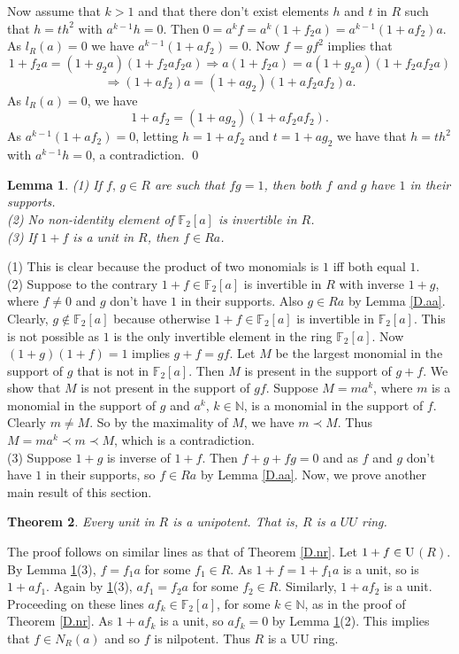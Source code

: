 \documentclass[12pt]{article}
\makeatletter
\theoremstyle{plain}
\newtheorem{thm}{Theorem}[section]
\newtheorem{lemma}[thm]{Lemma}
\theoremstyle{definition}
\renewenvironment{proof}[1][\proofname]{%
	\par\pushQED{\qed}%
	\normalfont %
	\topsep6\p@\@plus6\p@\relax
	\trivlist
	\item[\hskip\labelsep\bfseries #1\@addpunct{.}]%
}{%
	\popQED\endtrivlist\@endpefalse
}
\renewcommand{\proofname}{Proof}
\makeatother
\begin{document}
	Now assume that $k > 1$ and that there don't exist elements $h$ and $t$ in $R$ such that $h = th^2$ with $a^{k-1}h = 0$. Then $0 = a^kf = a^k(1 + f_2a) = a^{k-1}(1 + af_2)a$. As $l_R(a) = 0$ we have $a^{k-1}(1 + af_2) = 0$. Now $f = gf^2$ implies that $$1+f_2a = (1+g_2a)(1+f_2af_2a) \Rightarrow
	a(1+f_2a) = a(1+g_2a)(1+f_2af_2a)$$  $$\Rightarrow (1+af_2)a = (1+ag_2)(1+af_2af_2)a.$$ As $l_R(a) = 0$, we have
	$$ 1+af_2 = (1+ag_2)(1+af_2af_2).$$  As $a^{k-1}(1 + af_2) = 0$, letting $h = 1 + af_2$ and $t = 1+ag_2$ we have that $h = th^2$ with $a^{k-1}h = 0$, a contradiction. \qed
	\begin{lemma}\label{D.unitprop}
		\textup{(1)} If $f,\,g \in R$ are such that $fg = 1$, then both $f$ and $g$ have $1$ in their supports.\\[2mm]
		\textup{(2)} No non-identity element of $\mathbb{F}_2[a]$ is invertible in $R$. \\[2mm]
		\textup{(3)} If $1+f$ is a unit in $R$, then $f \in Ra$.
	\end{lemma}
	\begin{proof}
		\textup{(1)} This is clear because the product of two monomials is $1$ iff both equal $1$. \\[2mm]
		\textup{(2)} Suppose to the contrary $1 + f \in \mathbb{F}_2[a]$ is invertible in $R$ with inverse $1+g$, where $f\neq 0$ and $g$ don't have $1$ in their supports.
		Also $g \in Ra$ by Lemma \ref{D.aa}. Clearly, $g \notin \mathbb{F}_2[a]$ because otherwise $1+f \in \mathbb{F}_2[a]$ is invertible in $\mathbb{F}_2[a]$. This is not possible as $1$ is the only invertible element in the ring $\mathbb{F}_2[a]$. Now $(1+g)(1+f)=1$ implies $g+f = gf$. Let $M$ be the largest monomial in the support of $g$ that is not in $\mathbb{F}_2[a]$. Then $M$ is present in the support of $g+f$. We show that $M$ is not present in the support of $gf$. Suppose $M = ma^k$, where $m$ is a monomial in the support of $g$ and $a^k$, $k \in \mathbb{N}$, is a monomial in the support of $f$. Clearly $m \neq M$. So by the maximality of $M$, we have $m \prec M$. Thus $M = ma^k \prec m \prec M$, which is a contradiction. \\[2mm]
		\textup{(3)} Suppose $1+g$ is inverse of $1+f$. Then $f + g + fg = 0$ and as $f$ and $g$ don't have $1$ in their supports, so $f\in Ra$ by Lemma \ref{D.aa}. 
	\end{proof}
	Now, we prove another main result of this section.
	\begin{thm}\label{D.UU}
		Every unit in $R$ is a unipotent. That is, $R$ is a $UU$ ring.
	\end{thm}
	\begin{proof}
		The proof follows on similar lines as that of Theorem \ref{D.nr}. Let $1+f \in \rm{U}$$(R)$.  By Lemma \ref{D.unitprop}(3), $f= f_1a$ for some $f_1\in R$. As $1+ f = 1+ f_1a$ is a unit, so is $1+af_1$. Again by \ref{D.unitprop}(3), $af_1 = f_2a$ for some $f_2 \in R$. Similarly, $1+af_2$ is a unit. Proceeding on these lines $af_k \in \mathbb{F}_2[a]$, for some $k\in \mathbb{N}$, as in the proof of Theorem \ref{D.nr}. As $1+af_k$ is a unit, so $af_k = 0$ by Lemma \ref{D.unitprop}(2). This implies that $f \in N_R(a)$ and so $f$ is nilpotent. Thus $R$ is a UU ring.
	\end{proof} 
	
\end{document}
